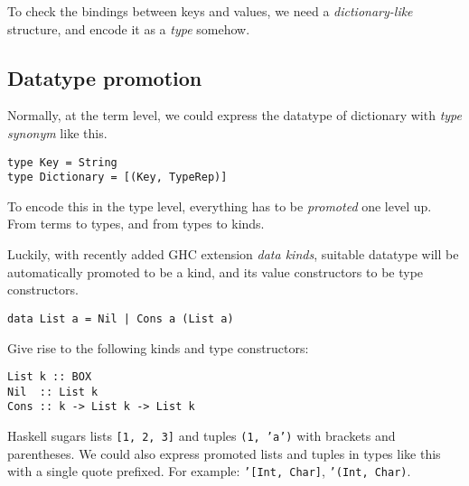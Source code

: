 \documentclass[pldi]{sigplanconf-pldi16}
\begin{document}
To check the bindings between keys and values, we need a \emph{dictionary-like}
 structure, and encode it as a \emph{type} somehow.

\subsection{Datatype promotion}
Normally, at the term level, we could express the datatype of dictionary with
\emph{type synonym} like this.\footnotemark

\begin{verbatim}
type Key = String
type Dictionary = [(Key, TypeRep)]
\end{verbatim}


To encode this in the type level, everything has to be
 \emph{promoted}\cite{promotion} one level up.
 From terms to types, and from types to kinds.

Luckily, with recently added GHC extension \emph{data kinds}, suitable
 datatype will be automatically promoted to be a kind, and its value
 constructors to be type constructors.

\begin{verbatim}
data List a = Nil | Cons a (List a)
\end{verbatim}

Give rise to the following kinds and type constructors:\footnotemark\footnotemark


\begin{verbatim}
List k :: BOX
Nil  :: List k
Cons :: k -> List k -> List k
\end{verbatim}

Haskell sugars lists \texttt{[1, 2, 3]} and tuples
 \texttt{(1, 'a')} with brackets and parentheses.
 We could also express promoted lists and tuples in types like this with
 a single quote prefixed. For example:
 \texttt{'}\texttt{[Int, Char]},
 \texttt{'}\texttt{(Int, Char)}.
\end{document}
